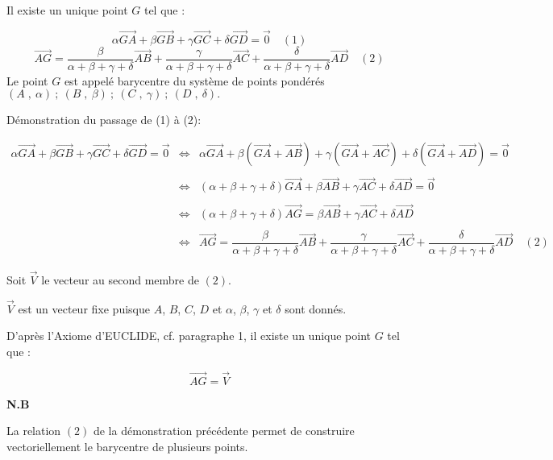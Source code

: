 \documentclass{article}
\begin{document}
	Il existe un unique point $G$ tel que :
	
	$$\alpha\overrightarrow{GA}+\beta\overrightarrow{GB}+\gamma\overrightarrow{GC}+\delta\overrightarrow{GD}=\overrightarrow{0}\quad(1)$$
	$$\overrightarrow{AG}=\dfrac{\beta}{\alpha+\beta+\gamma+\delta}\overrightarrow{AB}+\dfrac{\gamma}{\alpha+\beta+\gamma+\delta}\overrightarrow{AC}+\dfrac{\delta} {\alpha+\beta+\gamma+\delta}\overrightarrow{AD}\quad(2)$$
	Le point $G$ est appelé barycentre du système de points pondérés ${(A\;,\ \alpha)\ ;\ (B\;,\ \beta)\ ;\ (C\;,\ \gamma)\ ;\ (D\;,\ \delta)}.$
	
	Démonstration du passage de (1) à (2):
	
	$\begin{array}{rcl} \alpha\overrightarrow{GA}+\beta\overrightarrow{GB}+\gamma\overrightarrow{GC}+\delta\overrightarrow{GD}=\vec{0} & \Leftrightarrow & \alpha\overrightarrow{GA}+\beta\left(\overrightarrow{GA}+\overrightarrow{AB}\right)+\gamma\left(\overrightarrow{GA}+\overrightarrow{AC}\right)+\delta\left(\overrightarrow{GA}+\overrightarrow{AD}\right)=\vec{0}\\\\ & \Leftrightarrow & (\alpha+\beta+\gamma+\delta)\overrightarrow{GA}+\beta\overrightarrow{AB}+\gamma\overrightarrow{AC}+\delta\overrightarrow{AD}=\overrightarrow{0}\\\\ & \Leftrightarrow & (\alpha+\beta+\gamma+\delta)\overrightarrow{AG}=\beta\overrightarrow{AB}+\gamma\overrightarrow{AC}+\delta\overrightarrow{AD}\\\\ & \Leftrightarrow & \overrightarrow{AG}=\dfrac{\beta}{\alpha+\beta+\gamma+\delta}\overrightarrow{AB}+\dfrac{\gamma}{\alpha+\beta+\gamma+\delta}\overrightarrow{AC}+\dfrac{\delta} {\alpha+\beta+\gamma+\delta}\overrightarrow{AD}\quad(2)\end{array}$
	
	Soit $\overrightarrow{V}$ le vecteur au second membre de $(2).$
	
	$\overrightarrow{V}$ est un vecteur fixe puisque $A$, $B$, $C$, $D$ et $\alpha$, $\beta$, $\gamma$ et $\delta$ sont donnés.
	
	D'après l'Axiome d'EUCLIDE, cf. paragraphe 1, il existe un unique point $G$ tel que :
	
	$$\overrightarrow{AG}=\overrightarrow{V}$$
	
	\textbf{N.B}

	La relation $(2)$ de la démonstration précédente permet de construire vectoriellement le barycentre de plusieurs points.
\end{document}
